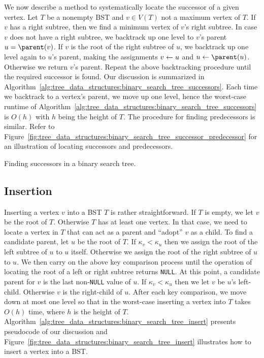 We now describe a method to systematically locate the successor of a
given vertex. Let $T$ be a nonempty BST and $v \in V(T)$ not a maximum
vertex of $T$. If $v$ has a right subtree, then we find a minimum
vertex of $v$'s right subtree. In case $v$ does not have a right
subtree, we backtrack up one level to $v$'s parent
$u = \parent(v)$. If $v$ is the root of the right subtree of $u$, we
backtrack up one level again to $u$'s parent, making the assignments
$v \leftarrow u$ and $u \assign \parent(u)$. Otherwise we return $v$'s
parent. Repeat the above backtracking procedure until the required
successor is found. Our discussion is summarized in
Algorithm~\ref{alg:tree_data_structures:binary_search_tree_successors}.
Each time we backtrack to a vertex's parent, we move up one
level, hence the worst-case runtime of
Algorithm~\ref{alg:tree_data_structures:binary_search_tree_successors}
is $O(h)$ with $h$ being the height of $T$. The procedure for finding
predecessors is similar. Refer to
Figure~\ref{fig:tree_data_structures:binary_search_tree_successor_predecessor}
for an illustration of locating successors and predecessors.

\begin{algorithm}[!htbp]

\caption{Finding successors in a binary search tree.}
\label{alg:tree_data_structures:binary_search_tree_successors}
\end{algorithm}



\subsection{Insertion}

Inserting a vertex $v$ into a BST $T$ is rather straightforward. If
$T$ is empty, we let $v$ be the root of $T$. Otherwise $T$ has at
least one vertex. In that case, we need to locate a vertex in $T$ that
can act as a parent and ``adopt'' $v$ as a child. To find a candidate
parent, let $u$ be the root of $T$. If $\kappa_v < \kappa_u$ then we
assign the root of the left subtree of $u$ to $u$ itself. Otherwise we
assign the root of the right subtree of $u$ to $u$. We then carry on
the above key comparison process until the operation of locating the
root of a left or right subtree returns \texttt{NULL}. At this point,
a candidate parent for $v$ is the last non-\texttt{NULL} value of
$u$. If $\kappa_v < \kappa_u$ then we let $v$ be $u$'s
left-child. Otherwise $v$ is the right-child of $u$. After each key
comparison, we move down at most one level so that in the worst-case
inserting a vertex into $T$ takes $O(h)$ time, where $h$ is the height
of $T$.
Algorithm~\ref{alg:tree_data_structures:binary_search_tree_insert}
presents pseudocode of our discussion and
Figure~\ref{fig:tree_data_structures:binary_search_tree_insert}
illustrates how to insert a vertex into a BST.


